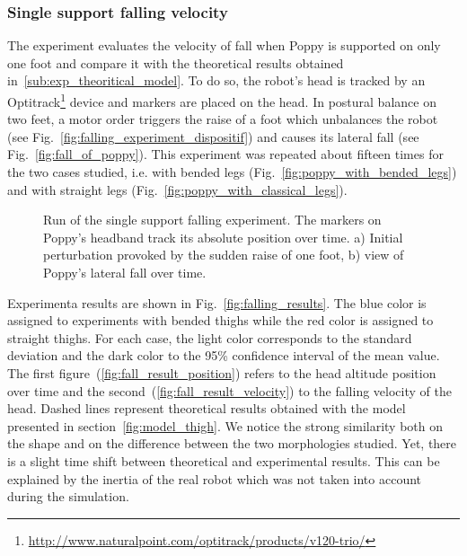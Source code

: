 \subsubsection{Single support falling velocity} %
\label{ssub:falling_velocity}
The experiment evaluates the velocity of fall  when Poppy  is supported on only one foot and compare it with the theoretical results obtained in~\ref{sub:exp_theoritical_model}. To do so, the robot's head is tracked by an Optitrack\footnote{\url{http://www.naturalpoint.com/optitrack/products/v120-trio/}} device and markers are placed on the head. In postural balance on two feet, a motor order triggers the raise of a foot which unbalances the robot (see Fig.~\ref{fig:falling_experiment_dispositif}) and causes its lateral fall (see Fig.~\ref{fig:fall_of_poppy}). This experiment was repeated about fifteen times for the two cases studied, i.e. with bended legs (Fig.~\ref{fig:poppy_with_bended_legs}) and with straight legs (Fig.~\ref{fig:poppy_with_classical_legs}).

\begin{figure}[h]
\centering
    \hfil
    \caption{Run of the single support falling experiment.
    The markers on Poppy’s headband track its absolute position over time.
     a) Initial perturbation provoked by the sudden raise of one foot, b) view of Poppy’s lateral fall over time.}
    \label{fig:falling_experiment}
\end{figure}

Experimenta results are shown in Fig.~\ref{fig:falling_results}. The blue color is assigned to experiments with bended thighs while the red color is assigned to straight thighs. For each case, the light color corresponds to the standard deviation and the dark color to the 95\% confidence interval of the mean value. The first figure~(\ref{fig:fall_result_position}) refers to the head altitude position over time and the second~(\ref{fig:fall_result_velocity}) to the falling velocity of the head. Dashed lines represent theoretical results obtained with the model presented in section~\ref{fig:model_thigh}. We notice the strong similarity both on the shape and on the difference between the two morphologies studied. Yet, there is a slight time shift between theoretical and experimental results. This can be explained by the inertia of the real robot which was not taken into account during the simulation.


